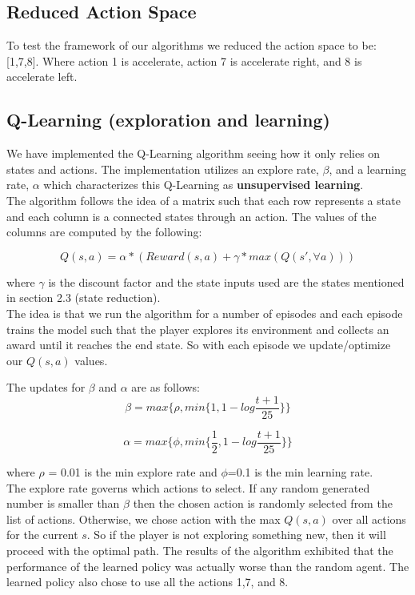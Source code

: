 \documentclass[10pt,twocolumn,letterpaper]{article}
\begin{document}
\subsection{Reduced Action Space}
To test the framework of our algorithms we reduced the action space to be: [1,7,8]. Where action 1 is accelerate, action 7 is accelerate right, and 8 is accelerate left. 

\subsection{Q-Learning (exploration and learning)}
We have implemented the Q-Learning algorithm seeing how it only relies on states and actions. The implementation utilizes an explore rate, $\beta$, and a learning rate, $\alpha$ which characterizes this Q-Learning as \textbf{unsupervised learning}. \\
The algorithm follows the idea of a matrix such that each row represents a state and each column is a connected states through an action. The values of the columns are computed by the following: 

$$Q(s, a) = \alpha*(Reward(s, a) + \gamma* max(Q(s', \forall a)))$$

where $\gamma$ is the discount factor and the state inputs used are the states mentioned in section 2.3 (state reduction).\\
The idea is that we run the algorithm for a number of episodes and each episode trains the model such that the player explores its environment and collects an award until it reaches the end state. So with each episode we update/optimize our $Q(s,a)$ values. 

The updates for $\beta$ and $\alpha$ are as follows:
$$\beta = max\{\rho, min\{1, 1 - log\frac{t+1}{25}\}\}$$

$$\alpha = max\{\phi, min\{\frac{1}{2}, 1- log\frac{t+1}{25}\}\}$$

where $\rho$ = 0.01 is the min explore rate and $\phi$=0.1 is the min learning rate. \\
The explore rate governs which actions to select. If any random generated number is smaller than $\beta$ then the chosen action is randomly selected from the list of actions. Otherwise, we chose action with the max $Q(s,a)$ over all actions for the current $s$. So if the player is not exploring something new, then it will proceed with the optimal path. The results of the algorithm exhibited that the performance of the learned policy was actually worse than the random agent. The learned policy also chose to use all the actions 1,7, and 8.\\
\end{document}
